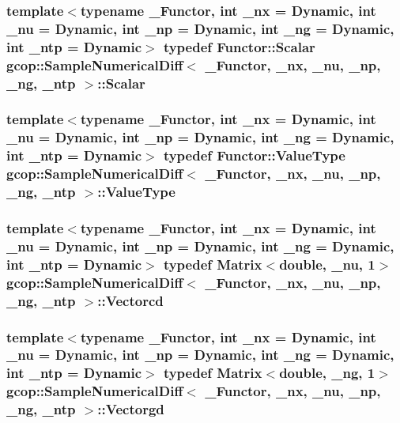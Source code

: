 \subsubsection[{\-Scalar}]{\setlength{\rightskip}{0pt plus 5cm}template$<$typename \-\_\-\-Functor, int \-\_\-nx = \-Dynamic, int \-\_\-nu = \-Dynamic, int \-\_\-np = \-Dynamic, int \-\_\-ng = \-Dynamic, int \-\_\-ntp = \-Dynamic$>$ typedef {\bf \-Functor\-::\-Scalar} {\bf gcop\-::\-Sample\-Numerical\-Diff}$<$ \-\_\-\-Functor, \-\_\-nx, \-\_\-nu, \-\_\-np, \-\_\-ng, \-\_\-ntp $>$\-::{\bf \-Scalar}}\label{classgcop_1_1SampleNumericalDiff_aaedc74c15a916c70af49eb7a1f34ffb1}
\subsubsection[{\-Value\-Type}]{\setlength{\rightskip}{0pt plus 5cm}template$<$typename \-\_\-\-Functor, int \-\_\-nx = \-Dynamic, int \-\_\-nu = \-Dynamic, int \-\_\-np = \-Dynamic, int \-\_\-ng = \-Dynamic, int \-\_\-ntp = \-Dynamic$>$ typedef {\bf \-Functor\-::\-Value\-Type} {\bf gcop\-::\-Sample\-Numerical\-Diff}$<$ \-\_\-\-Functor, \-\_\-nx, \-\_\-nu, \-\_\-np, \-\_\-ng, \-\_\-ntp $>$\-::{\bf \-Value\-Type}}\label{classgcop_1_1SampleNumericalDiff_a4507e69a28ea032a0a8f96fa98b38fe6}
\subsubsection[{\-Vectorcd}]{\setlength{\rightskip}{0pt plus 5cm}template$<$typename \-\_\-\-Functor, int \-\_\-nx = \-Dynamic, int \-\_\-nu = \-Dynamic, int \-\_\-np = \-Dynamic, int \-\_\-ng = \-Dynamic, int \-\_\-ntp = \-Dynamic$>$ typedef \-Matrix$<$double, \-\_\-nu, 1$>$ {\bf gcop\-::\-Sample\-Numerical\-Diff}$<$ \-\_\-\-Functor, \-\_\-nx, \-\_\-nu, \-\_\-np, \-\_\-ng, \-\_\-ntp $>$\-::{\bf \-Vectorcd}}\label{classgcop_1_1SampleNumericalDiff_a449da24b9a9cd294e15337b7473a2a0a}
\subsubsection[{\-Vectorgd}]{\setlength{\rightskip}{0pt plus 5cm}template$<$typename \-\_\-\-Functor, int \-\_\-nx = \-Dynamic, int \-\_\-nu = \-Dynamic, int \-\_\-np = \-Dynamic, int \-\_\-ng = \-Dynamic, int \-\_\-ntp = \-Dynamic$>$ typedef \-Matrix$<$double, \-\_\-ng, 1$>$ {\bf gcop\-::\-Sample\-Numerical\-Diff}$<$ \-\_\-\-Functor, \-\_\-nx, \-\_\-nu, \-\_\-np, \-\_\-ng, \-\_\-ntp $>$\-::{\bf \-Vectorgd}}\label{classgcop_1_1SampleNumericalDiff_a2b88a60913bf645762444989a72a83f3}
